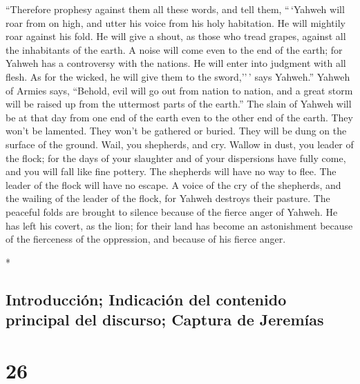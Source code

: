 \begin{paracol}{2}
\begin{otherlanguage}{english}
 ``Therefore prophesy against them all these words, and
tell them, ``\,`Yahweh will roar from on high, and utter his voice from
his holy habitation. He will mightily roar against his fold. He will
give a shout, as those who tread grapes, against all the inhabitants of
the earth.  A noise will come even to the end of the
earth; for Yahweh has a controversy with the nations. He will enter into
judgment with all flesh. As for the wicked, he will give them to the
sword,''\,' says Yahweh.''  Yahweh of Armies says,
``Behold, evil will go out from nation to nation, and a great storm will
be raised up from the uttermost parts of the earth.'' 
The slain of Yahweh will be at that day from one end of the earth even
to the other end of the earth. They won't be lamented. They won't be
gathered or buried. They will be dung on the surface of the ground.
 Wail, you shepherds, and cry. Wallow in dust, you leader
of the flock; for the days of your slaughter and of your dispersions
have fully come, and you will fall like fine pottery. 
The shepherds will have no way to flee. The leader of the flock will
have no escape.  A voice of the cry of the shepherds, and
the wailing of the leader of the flock, for Yahweh destroys their
pasture.  The peaceful folds are brought to silence
because of the fierce anger of Yahweh.  He has left his
covert, as the lion; for their land has become an astonishment because
of the fierceness of the oppression, and because of his fierce anger.

\end{otherlanguage}

\switchcolumn[0]*

\hypertarget{introducciuxf3n-indicaciuxf3n-del-contenido-principal-del-discurso-captura-de-jeremuxedas}{%
\subsection{Introducción; Indicación del contenido principal del
discurso; Captura de
Jeremías}\label{introducciuxf3n-indicaciuxf3n-del-contenido-principal-del-discurso-captura-de-jeremuxedas}}

\hypertarget{section-50}{%
\section{26}\label{section-50}}


\end{paracol}
